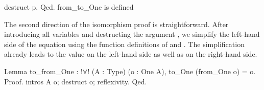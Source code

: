 \begin{cproof}{destruct p. Qed.}
  from_to_One is defined
\end{cproof}

The second direction of the isomorphism proof is straightforward.
After introducing all variables and destructing the argument , we simplify the left\--hand side of the equation using the function definitions of  and .
The simplification already leads to the value  on the left\--hand side as well as on the right\--hand side.

\begin{coqcode}
Lemma to_from_One : !$\forall$! (A : Type) (o : One A),
    to_One (from_One o) = o.
Proof.
  intros A o; destruct o; reflexivity.
Qed.
\end{coqcode}
